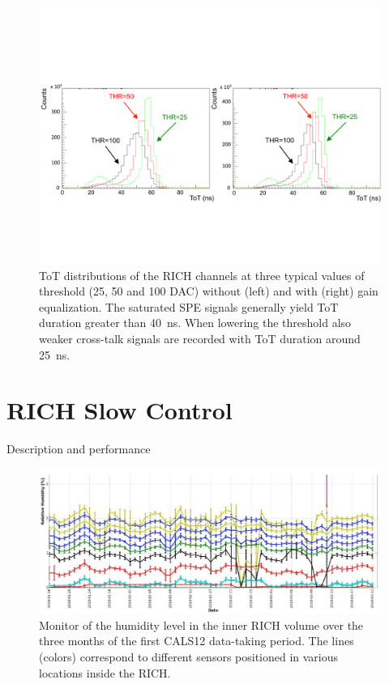\documentclass[final,5p,times,twocolumn]{elsarticle}
\begin{document}
\begin{figure}[t]
\begin{center}
\includegraphics[width=1.0\columnwidth]{EPS/Figure6.pdf}
\end{center}
\caption{ToT distributions of the RICH channels at three typical values of 
threshold (25, 50 and 100 DAC) without (left) and with (right) gain equalization.
The saturated SPE signals generally yield ToT duration greater than 40~ns.
When lowering the threshold also weaker cross-talk signals are recorded
with ToT duration around 25~ns.}
\label{Fig:Equali}
\end{figure}

\section{RICH Slow Control}

Description and performance

\begin{figure}[t]
\begin{center}
\includegraphics[width=1.0\columnwidth]{EPS/Humidity.png}
\end{center}
\caption{Monitor of the humidity level in the inner RICH volume over the three months of the first
CALS12 data-taking period. The lines (colors) correspond to different sensors positioned in 
various locations inside the RICH.}
\label{Fig:EfScan}
\end{figure}
\end{document}
